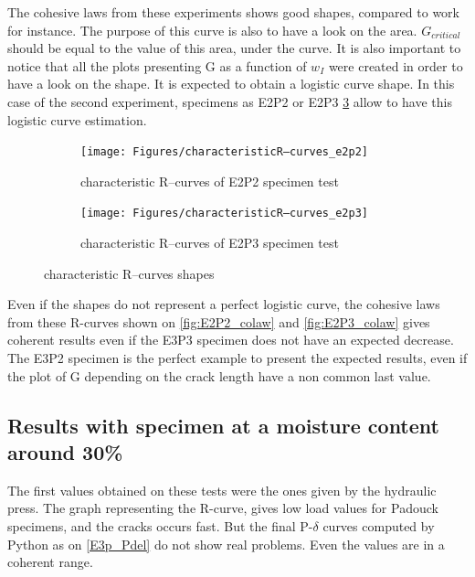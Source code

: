 The cohesive laws from these experiments shows good shapes, compared to \parencite{Reference14} work for instance. The purpose of this curve is also to have a look on the area. $G_{critical}$ should be equal to the value of this area, under the curve. It is also important to notice that all the plots presenting G as a function of $w_{I}$ were created in order to have a look on the shape. It is expected to obtain a logistic curve shape. In this case of the second experiment, specimens as E2P2 or E2P3 \ref{RCexample} allow to have this logistic curve estimation.

\begin{figure}[h]
	\centering
	\begin{subfigure}{0.48\linewidth}
		\centering
		\texttt{[image: Figures/characteristicR–curves\_e2p2]}
		\decoRule
		\caption[characteristic R–curves before cohesive law ploting E2P2]{characteristic R–curves of E2P2 specimen test}
		\label{fig:RcE2P2}
	\end{subfigure}
	\hfill
	\begin{subfigure}{0.48\linewidth}
		\texttt{[image: Figures/characteristicR–curves\_e2p3]}
		\decoRule
		\caption[characteristic R–curves before cohesive law ploting E2P3]{characteristic R–curves of E2P3 specimen test}
		\label{fig:RcE2P3}
	\end{subfigure}
	\caption{characteristic R–curves shapes}
	\label{RCexample}
\end{figure}

Even if the shapes do not represent a perfect logistic curve, the cohesive laws from these R-curves shown on \ref{fig:E2P2_colaw} and \ref{fig:E2P3_colaw} gives coherent results even if the E3P3 specimen does not have an expected decrease. The E3P2 specimen is the perfect example to present the expected results, even if the plot of G depending on the crack length have a non common last value.

\newpage

\subsection{Results with specimen at a moisture content around 30\% }

The first values obtained on these tests were the ones given by the hydraulic press. The graph representing the R-curve, gives low load values for Padouck specimens, and the cracks occurs fast. But the final P-$\delta$ curves computed by Python as on \ref{E3p_Pdel} do not show real problems. Even the values are in a coherent range.

